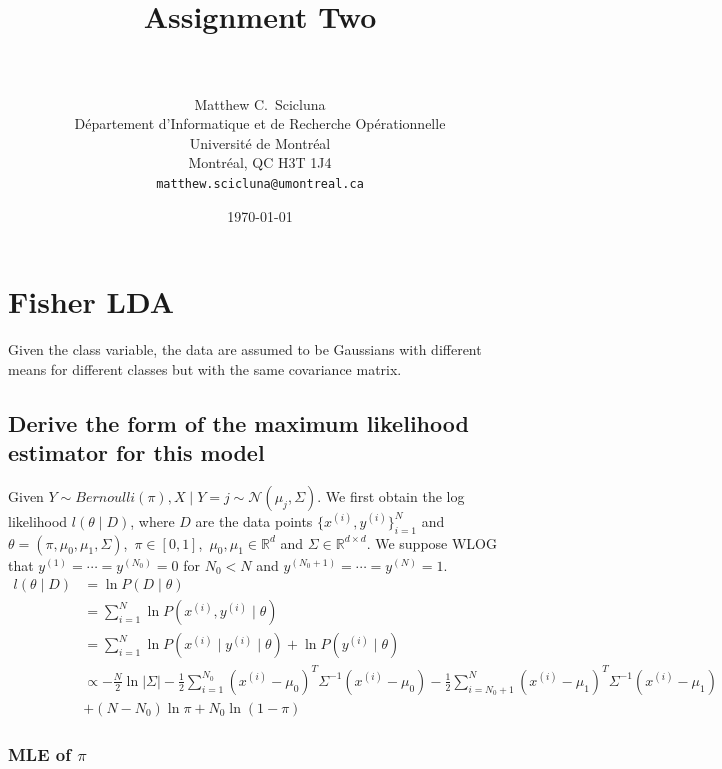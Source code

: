 \documentclass[paper=a4, fontsize=11pt]{scrartcl} %
\title{	
\normalfont \normalsize 
\horrule{0.5pt} \\[0.4cm] %
\huge Assignment Two \\ %
\horrule{2pt} \\[0.5cm] %
}
\author{
	Matthew C.~Scicluna\\
	D\'epartement d'Informatique et de Recherche Op\'erationnelle\\
	Universit\'e de Montr\'eal\\
	Montr\'eal, QC H3T 1J4 \\
	\texttt{matthew.scicluna@umontreal.ca}
}
\date{\normalsize\today} %
\numberwithin{equation}{section} %
\numberwithin{figure}{section} %
\numberwithin{table}{section} %
\begin{document}
\maketitle %

\section{Fisher LDA}
Given the class variable, the data are assumed to be Gaussians with different means for different classes but with the same covariance matrix.

\subsection{Derive the form of the maximum likelihood estimator for this model}
	Given \(Y \sim Bernoulli(\pi), X \mid Y = j \sim \mathcal{N}(\mu_j, \Sigma) \). We first obtain the log likelihood \(l(\theta \mid D)\), where \(D\) are the data points \(\{x^{(i)}, y^{(i)}\}_{i=1}^N\) and \(\theta = (\pi, \mu_0,\mu_1, \Sigma)\),\ \(\pi \in [0,1]\),\ \(\mu_0,\mu_1 \in \mathbb{R}^d \) and \(\Sigma \in \mathbb{R}^{d \times d} \). We suppose WLOG that \(y^{(1)} = \cdots = y^{(N_0)} = 0 \) for \(N_0<N\) and \(y^{(N_0+1)} = \cdots = y^{(N)} = 1 \). 
	\begin{align*}
	l(\theta \mid D) &= \ln P(D \mid \theta) \\
	&= \sum_{i=1}^{N} \ln P(x^{(i)}, y^{(i)} \mid \theta) \\ 
	&= \sum_{i=1}^{N} \ln P(x^{(i)} \mid y^{(i)} \mid \theta) + \ln P(y^{(i)} \mid \theta)\\
	& \propto -\frac{N}{2}\ln |\Sigma| -\frac{1}{2} \sum_{i=1}^{N_0}  (x^{(i)}-\mu_{0})^T\Sigma^{-1}(x^{(i)}-\mu_{0}) -\frac{1}{2} \sum_{i=N_0 + 1}^{N}  (x^{(i)}-\mu_{1})^T\Sigma^{-1}(x^{(i)}-\mu_{1}) \\
	&+ (N-N_0)\ln \pi + N_0\ln(1-\pi)
	\end{align*}
	
\subsubsection{MLE of \(\pi\)}
	
\end{document}
